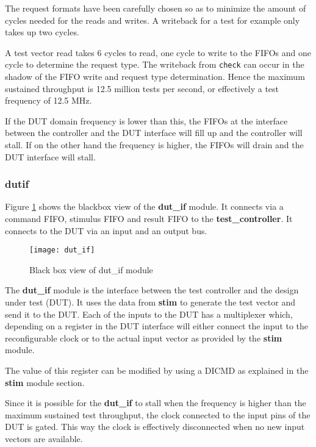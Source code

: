 The request formats have been carefully chosen so as to minimize the amount of cycles
needed for the reads and writes. A writeback for a test for example only takes up two cycles.

A test vector read takes 6 cycles to read, one cycle to write to the FIFOs and one
cycle to determine the request type. The writeback from \texttt{check} can occur in the shadow of the FIFO write
and request type determination. Hence the maximum sustained throughput is 12.5 million tests per second, or
effectively a test frequency of 12.5 MHz.

If the DUT domain frequency is lower than this, the FIFOs at the interface between the controller and the
DUT interface will fill up and the controller will stall. If on the other hand the frequency is higher, the FIFOs
will drain and the DUT interface will stall.



\subsubsection{dut\textunderscore if}
Figure \ref{fig:bb_dut_if} shows the blackbox view of the \textbf{dut\_if} module. It connects via a command FIFO, stimulus FIFO
and result FIFO to the \textbf{test\_controller}. It connects to the DUT via an input and an output bus.


\begin{figure}
 \centering
 \texttt{[image: dut\_if]}
 \caption{Black box view of dut\_if module}
 \label{fig:bb_dut_if}
\end{figure}


The \textbf{dut\_if} module is the interface between the test controller and the design under test (DUT).
It uses the data from \textbf{stim} to generate the test vector and send it to the DUT. Each of the inputs
to the DUT has a multiplexer which, depending on a register in the DUT interface will either connect the
input to the reconfigurable clock or to the actual input vector as provided by the \textbf{stim} module.

The value of this register can be modified by using a DICMD as explained in the \textbf{stim} module section.

Since it is possible for the \textbf{dut\_if} to stall when the frequency is higher than the maximum sustained
test throughput, the clock connected to the input pins of the DUT is gated. This way the clock is effectively
disconnected when no new input vectors are available.

